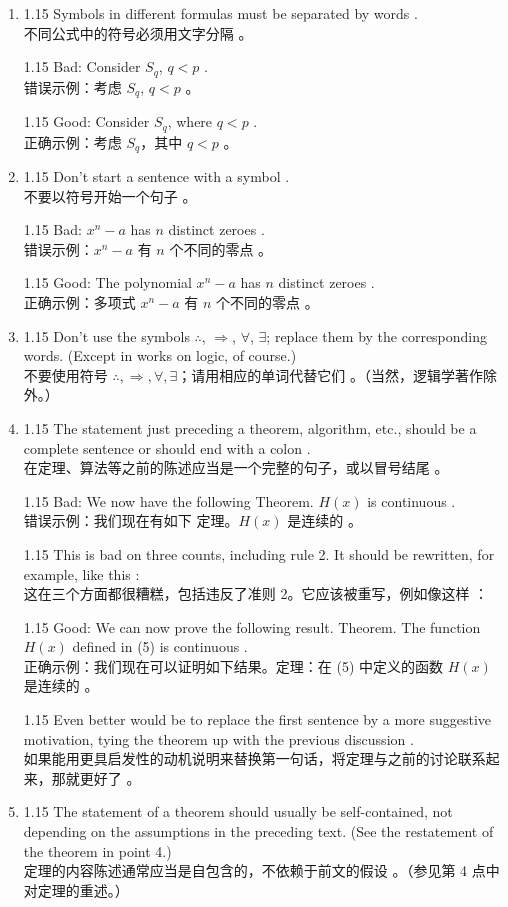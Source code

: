 \documentclass[12pt,a4paper]{article}
\newcommand{\bilingual}[2]{
    \begin{spacing}{1.15} %
        \noindent \normalsize #1 \\[-0.5ex] %
        \small \textcolor{blue!70!black}{#2} %
    \end{spacing}
    \vspace{0.8em} %
}
\begin{document}
\begin{enumerate}

\item \bilingual{Symbols in different formulas must be separated by words .}{不同公式中的符号必须用文字分隔 。}
\bilingual{Bad: Consider $S_{q}$, $q<p$ .}{错误示例：考虑 $S_{q}$, $q<p$ 。}
\bilingual{Good: Consider $S_{q}$, where $q<p$ .}{正确示例：考虑 $S_{q}$，其中 $q<p$ 。}

\item \bilingual{Don't start a sentence with a symbol .}{不要以符号开始一个句子 。}
\bilingual{Bad: $x^{n}-a$ has $n$ distinct zeroes .}{错误示例：$x^{n}-a$ 有 $n$ 个不同的零点 。}
\bilingual{Good: The polynomial $x^{n}-a$ has $n$ distinct zeroes .}{正确示例：多项式 $x^{n}-a$ 有 $n$ 个不同的零点 。}

\item \bilingual{Don't use the symbols $\therefore$, $\Rightarrow$, $\forall$, $\exists$; replace them by the corresponding words. (Except in works on logic, of course.) }{不要使用符号 $\therefore, \Rightarrow, \forall, \exists$；请用相应的单词代替它们 。（当然，逻辑学著作除外。） }

\item \bilingual{The statement just preceding a theorem, algorithm, etc., should be a complete sentence or should end with a colon .}{在定理、算法等之前的陈述应当是一个完整的句子，或以冒号结尾 。}
\bilingual{Bad: We now have the following Theorem. $H(x)$ is continuous .}{错误示例：我们现在有如下 定理。$H(x)$ 是连续的 。}
\bilingual{This is bad on three counts, including rule 2. It should be rewritten, for example, like this :}{这在三个方面都很糟糕，包括违反了准则 2。它应该被重写，例如像这样 ：}
\bilingual{Good: We can now prove the following result. Theorem. The function $H(x)$ defined in (5) is continuous .}{正确示例：我们现在可以证明如下结果。定理：在 (5) 中定义的函数 $H(x)$ 是连续的 。}
\bilingual{Even better would be to replace the first sentence by a more suggestive motivation, tying the theorem up with the previous discussion .}{如果能用更具启发性的动机说明来替换第一句话，将定理与之前的讨论联系起来，那就更好了 。}

\item \bilingual{The statement of a theorem should usually be self-contained, not depending on the assumptions in the preceding text. (See the restatement of the theorem in point 4.) }{定理的内容陈述通常应当是自包含的，不依赖于前文的假设 。（参见第 4 点中对定理的重述。） }


\end{enumerate}
\end{document}
